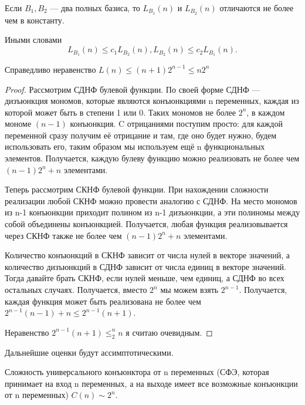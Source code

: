 \begin{theorem}
	Если $B_1, B_2$ --- два полных базиса, то $L_{B_1}(n)$ и  $L_{B_2}(n)$
	отличаются не более чем в константу.
	
	Иными словами \[
		L_{B_1}(n) \le c_1 L_{B_2}(n), L_{B_2}(n) \le c_2 L_{B_1}(n)
	.\]
\end{theorem}
\begin{theorem}
	Справедливо неравенство $L(n) \le (n+1)2^{n-1} \le n2^n$
\end{theorem}
\begin{proof}
Рассмотрим СДНФ булевой функции. По своей форме СДНФ --- дизъюнкция мономов,
которые являются конъюнкциями n переменных, каждая из которой может быть в
степени 1 или 0. Таких мономов не более $2^n$, в каждом мономе $(n-1)$ конъюнкция.
C отрицаниями поступим просто: для каждой переменной сразу получим её отрицание
и там, где оно будет нужно, будем использовать его, таким образом мы используем
ещё n функциональных элементов. Получается, каждую
булеву функцию можно реализовать не более чем  $\left( n-1 \right) 2^n + n$
элементами. 

Теперь рассмотрим СКНФ булевой функции. При нахождении сложности реализации
любой СКНФ можно провести аналогию с СДНФ. На место мономов из n-1 конъюнкции
приходит полином из n-1 дизъюнкции, а эти полиномы между собой объединены
конъюнкцией. Получается, любая функция реализовывается через СКНФ также не более
чем $\left( n-1 \right) 2^n + n$ элементами.

Количество конъюнкций в СКНФ зависит от числа нулей в векторе значений, а
количество дизъюнкций в СДНФ зависит от числа единиц в векторе значений. Тогда
давайте брать СКНФ, если нулей меньше, чем единиц, а СДНФ во всех остальных
случаях. Получается, вместо $2^n$ мы можем взять $2^{n-1}$. Получается, каждая
функция может быть реализована не более чем $2^{n-1}\left( n-1 \right) + n \le
2^{n-1}(n+1)$.

Неравенство $2^{n-1}(n+1)\le_2^n n$ я считаю очевидным.
\end{proof}
Дальнейшие оценки будут ассимптотическими.
\begin{theorem}
Сложность универсального конъюнктора от n переменных (СФЭ, которая принимает на
вход n переменных, а на выходе имеет все возможные конъюнкции от n переменных)
$C(n) \sim 2^n.$
\end{theorem}
